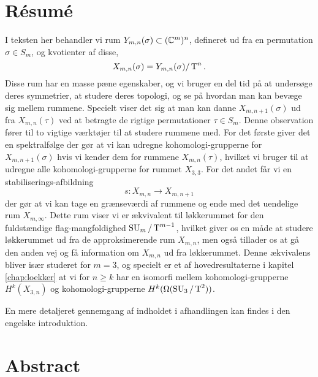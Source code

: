 


\chapter{Résumé} 

I teksten her behandler vi rum $Y_{m,n}(\sigma)\subset (\mathbb{C}^m)^n$,
defineret ud fra
en permutation $\sigma\in S_m$, og
kvotienter af disse,
\[ X_{m,n}(\sigma) = Y_{m,n}(\sigma) /\operatorname{T}^n. \]
Disse rum har en masse pæne egenskaber, og vi bruger en del tid på at
undersøge deres symmetrier, at studere deres topologi, og se på hvordan
man kan bevæge sig mellem
rummene. Specielt viser det sig at man kan danne $X_{m,n+1}(\sigma)$ ud
fra $X_{m,n}(\tau)$ ved at betragte de rigtige permutationer
$\tau\in S_m$. Denne observation fører til to vigtige værktøjer til at
studere rummene med. For det første giver det en spektralfølge der gør
at vi kan udregne
kohomologi-grupperne for $X_{m,n+1}(\sigma)$ hvis vi kender dem for
rummene $X_{m,n}(\tau)$, hvilket vi bruger til at udregne alle
kohomologi-grupperne for rummet $X_{3,3}$. For det andet får vi en
stabiliserings-afbildning
\[ s : X_{m,n} \to X_{m,n+1} \]
der gør at vi kan tage en grænseværdi af rummene og ende med det
uendelige rum $X_{m,\infty}$. Dette rum viser vi er ækvivalent til
løkkerummet for den fuldstændige flag-mangfoldighed $\operatorname{SU}_{m}/\operatorname{T}^{m-1}$, hvilket
giver os en måde at studere løkkerummet ud fra de approksimerende rum
$X_{m,n}$, men også tillader os at gå den anden vej og få information
om $X_{m,n}$ ud fra løkkerummet. Denne ækvivalens bliver især
studeret for $m = 3$, og specielt er et af hovedresultaterne i
kapitel \ref{chap:loekker} at vi for $n \geq k$ har en isomorfi mellem
kohomologi-grupperne $H^k(X_{3,n})$ og kohomologi-grupperne 
$H^k(\Omega(\operatorname{SU}_3/\operatorname{T}^2))$.

En mere detaljeret gennemgang af indholdet i afhandlingen kan
findes i den engelske introduktion.

\chapter{Abstract}

